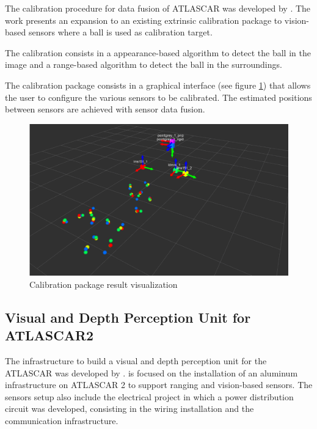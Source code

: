 The calibration procedure for data fusion of ATLASCAR was developed by \cite{VieiradaSilva2016}. The work presents an expansion to an existing extrinsic calibration package to vision-based sensors where a ball is used as calibration target. 

The calibration consists in a appearance-based algorithm to detect the ball in the image and a range-based algorithm to detect the ball in the surroundings. 

The calibration package consists in a graphical interface (see figure \ref{fig:david}) that allows the user to configure the various sensors to be calibrated. The estimated positions between sensors are achieved with sensor data fusion.

\begin{figure}[htp]
	
	\centering
	\includegraphics[width=1\textwidth]{capstate/imgs/david.png}
	
	\caption{Calibration package result visualization}
	\label{fig:david}
	
\end{figure}

\subsection{Visual and Depth Perception Unit for ATLASCAR2} 

The infrastructure to build a visual and depth perception unit for the ATLASCAR was developed by \cite{Correia2017}.  is focused on the installation of an aluminum infrastructure on ATLASCAR 2 to support ranging and vision-based sensors. The sensors setup also include the electrical project in which a power distribution circuit was developed, consisting in the wiring installation and the communication infrastructure. 

